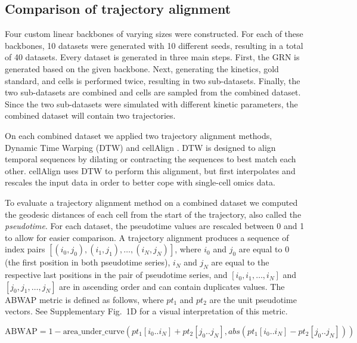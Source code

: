 \documentclass[10pt, a4paper]{article}
\begin{document}
\hypertarget{sec:dyngen-tacompare}{%
	\subsection*{Comparison of trajectory
		alignment}\label{sec:dyngen-tacompare}}

Four custom linear backbones of varying sizes were constructed. For each
of these backbones, 10 datasets were generated with 10 different seeds,
resulting in a total of 40 datasets. Every dataset is generated in three
main steps. First, the GRN is generated based on the given backbone.
Next, generating the kinetics, gold standard, and cells is performed
twice, resulting in two sub-datasets. Finally, the two sub-datasets are
combined and cells are sampled from the combined dataset. Since the two
sub-datasets were simulated with different kinetic parameters, the
combined dataset will contain two trajectories.

On each combined dataset we applied two trajectory alignment methods,
Dynamic Time Warping (DTW)
\cite{giorgino_computingvisualizingdynamic_2009} and cellAlign
\cite{alpert_alignmentsinglecelltrajectories_2018}. DTW is designed
to align temporal sequences by dilating or contracting the sequences to
best match each other. cellAlign uses DTW to perform this alignment, but
first interpolates and rescales the input data in order to better cope
with single-cell omics data.

To evaluate a trajectory alignment method on a combined dataset we
computed the geodesic distances of each cell from the start of the
trajectory, also called the \emph{pseudotime}. For each dataset, the
pseudotime values are rescaled between 0 and 1 to allow for easier
comparison. A trajectory alignment produces a sequence of index pairs
\([(i_0, j_0), (i_1, j_1), \ldots, (i_N, j_N)]\), where \(i_0\) and
\(j_0\) are equal to 0 (the first position in both pseudotime series),
\(i_N\) and \(j_N\) are equal to the respective last positions in the
pair of pseudotime series, and \([i_0, i_1, \ldots, i_N]\) and
\([j_0, j_1, \ldots, j_N]\) are in ascending order and can contain
duplicates values. The ABWAP metric is defined as follows, where
\(pt_1\) and \(pt_2\) are the unit pseudotime vectors. See Supplementary
Fig.~1D for a visual interpretation of this metric.

\begin{equation}
	\textrm{ABWAP} = 1 - \textrm{area\_under\_curve}(pt_1[i_0 .. i_N] + pt_2[j_0 .. j_N], abs(pt_1[i_0 .. i_N] - pt_2[j_0 .. j_N]))
\end{equation}
\end{document}
